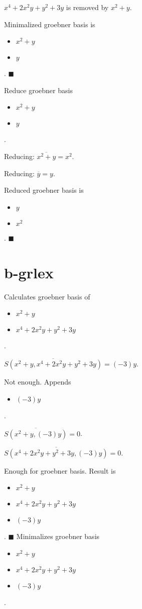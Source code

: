 \documentclass{jsarticle}
\begin{document}
$x^{4}+2x^{2}y+y^{2}+3y$ is removed by $x^{2}+y$.  

Minimalized groebner basis is 
\begin{itemize}
\item $x^{2}+y$
\item $y$
\end{itemize}  . 
$\blacksquare{}$

Reduce groebner basis 
\begin{itemize}
\item $x^{2}+y$
\item $y$
\end{itemize}  . 


Reducing: $\overline{x^{2}+y} = x^{2}$.  

Reducing: $\overline{y} = y$.  

Reduced groebner basis is 
\begin{itemize}
\item $y$
\item $x^{2}$
\end{itemize}  . 
$\blacksquare{}$

\section{b-grlex}Calculates groebner basis of 
\begin{itemize}
\item $x^{2}+y$
\item $x^{4}+2x^{2}y+y^{2}+3y$
\end{itemize}  . 


$\overline{S(x^{2}+y, x^{4}+2x^{2}y+y^{2}+3y)} = (-3)y$.  

Not enough.  Appends \begin{itemize}
\item $(-3)y$
\end{itemize}  . 


$\overline{S(x^{2}+y, (-3)y)} = 0$.  

$\overline{S(x^{4}+2x^{2}y+y^{2}+3y, (-3)y)} = 0$.  

Enough for groebner basis.  Result is \begin{itemize}
\item $x^{2}+y$
\item $x^{4}+2x^{2}y+y^{2}+3y$
\item $(-3)y$
\end{itemize}  . 
$\blacksquare{}$
Minimalizes groebner basis 
\begin{itemize}
\item $x^{2}+y$
\item $x^{4}+2x^{2}y+y^{2}+3y$
\item $(-3)y$
\end{itemize}  . 
\end{document}
